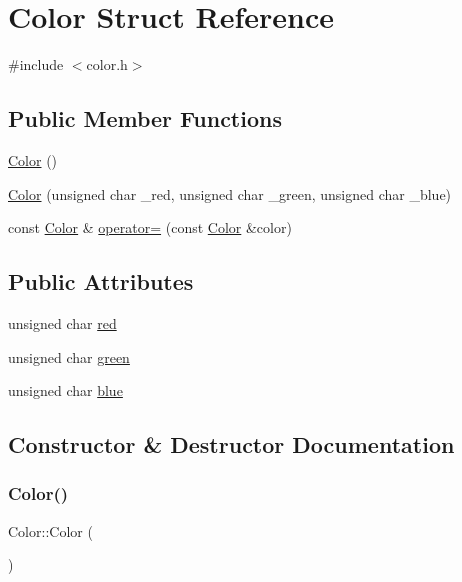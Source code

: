 \hypertarget{structColor}{}\section{Color Struct Reference}
\label{structColor}


{\ttfamily \#include $<$color.\+h$>$}

\subsection*{Public Member Functions}
\begin{DoxyCompactItemize}
\item 
\hyperlink{structColor_a9a742cbe9f9f4037f5d9f4e81a9b2428}{Color} ()
\item 
\hyperlink{structColor_ad999a91996687a8593bd646ae9a9dbbf}{Color} (unsigned char \+\_\+red, unsigned char \+\_\+green, unsigned char \+\_\+blue)
\item 
const \hyperlink{structColor}{Color} \& \hyperlink{structColor_ad16157e8a956c472eab89137edde458a}{operator=} (const \hyperlink{structColor}{Color} \&color)
\end{DoxyCompactItemize}
\subsection*{Public Attributes}
\begin{DoxyCompactItemize}
\item 
unsigned char \hyperlink{structColor_a245f5a423cdaaaeff27047036c24b7ef}{red}
\item 
unsigned char \hyperlink{structColor_a070831365fe6c626bc0020915a917081}{green}
\item 
unsigned char \hyperlink{structColor_a5b425af958edb0e7835eb08daeb90e71}{blue}
\end{DoxyCompactItemize}


\subsection{Constructor \& Destructor Documentation}
\mbox{\label{structColor_a9a742cbe9f9f4037f5d9f4e81a9b2428}} 
\subsubsection{\texorpdfstring{Color()}{Color()}\hspace{0.1cm}{\footnotesize\ttfamily [1/2]}}
{\footnotesize\ttfamily Color\+::\+Color (\begin{DoxyParamCaption}{ }\end{DoxyParamCaption})\hspace{0.3cm}{\ttfamily [inline]}}

